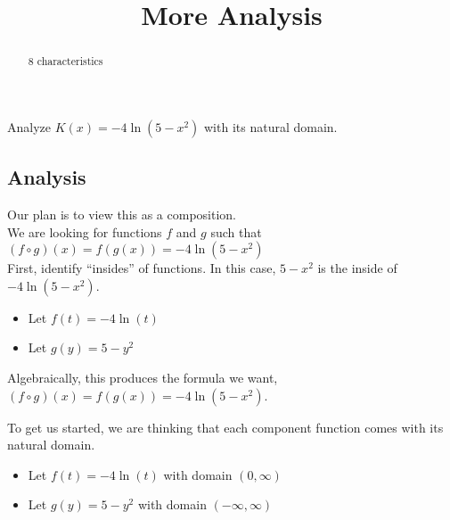 \documentclass{ximera}
\title{More Analysis}
\begin{document}
\begin{abstract}
8 characteristics
\end{abstract}
\maketitle












Analyze $K(x) = -4 \ln(5 - x^2)$ with its natural domain. \\




\subsection*{Analysis}





Our plan is to view this as a composition. \\






We are looking for functions $f$ and $g$ such that $(f \circ g)(x) = f(g(x)) = -4 \ln(5 - x^2)$ \\


First, identify ``insides'' of functions.  In this case, $5 - x^2$ is the inside of $-4 \ln(5 - x^2)$. \\



\begin{itemize}
\item Let $f(t) = -4 \ln(t)$ \\
\item Let $g(y) = 5 - y^2$ \\
\end{itemize}

Algebraically, this produces the formula we want, $(f \circ g)(x) = f(g(x)) = -4 \ln(5 - x^2)$.


To get us started, we are thinking that each component function comes with its natural domain.

\begin{itemize}
\item Let $f(t) = -4 \ln(t)$ with domain $(0, \infty)$ \\
\item Let $g(y) = 5 - y^2$ with domain $(-\infty, \infty)$ \\
\end{itemize}
\end{document}
